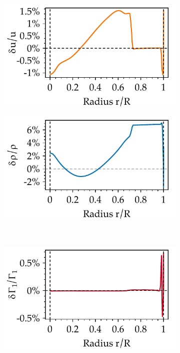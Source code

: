 \begin{figure}
    \centering
    \begin{subfigure}[b]{0.5\linewidth}
        \centering
        \includegraphics[width=\textwidth,keepaspectratio]{figs/pulse/diffs/d_u-D_no_diffusion.pdf}
    \end{subfigure}%
    \begin{subfigure}[b]{0.5\linewidth}
        \centering
        \includegraphics[width=\textwidth,keepaspectratio]{figs/pulse/diffs/d_rho-D_no_diffusion.pdf}%
    \end{subfigure}\\
    \begin{subfigure}[b]{0.5\linewidth}
        \centering
        \includegraphics[width=\textwidth,keepaspectratio]{figs/pulse/diffs/d_Gamma1-D_no_diffusion.pdf}%

\end{subfigure}
\end{figure}
